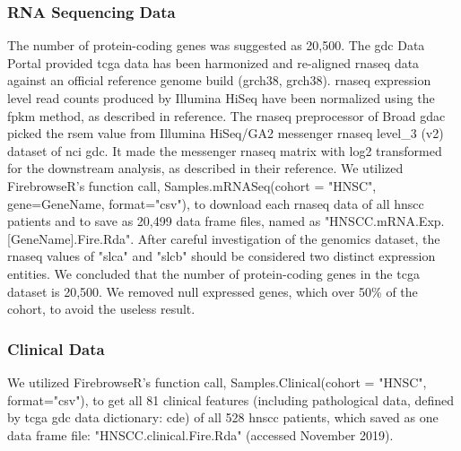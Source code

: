 \documentclass[jpm,article,submit,moreauthors,pdftex]{Definitions/mdpi}
\begin{document}
\begin{paracol}{2}
\subsubsection{RNA Sequencing Data} 

The number of protein-coding genes was suggested as 20,500\cite{Clamp2007}. The \acrshort{gdc} Data Portal provided \acrshort{tcga} data has been harmonized and re-aligned \acrlong{rnaseq} data against an official reference genome build (\acrlong{grch38}, \acrshort{grch38}). \acrshort{rnaseq} expression level read counts produced by Illumina HiSeq have been normalized using the \acrfull{fpkm} method, as described in reference\cite{FPKM2017}.
The \acrshort{rnaseq} preprocessor of Broad \acrshort{gdac} picked the \acrfull{rsem} value from Illumina HiSeq/GA2 messenger \acrshort{rnaseq} level\_3 (v2) dataset of \acrshort{nci} \acrshort{gdc}. It made the messenger \acrshort{rnaseq} matrix with log2 transformed for the downstream analysis, as described in their reference\cite{RSEM2016}.
We utilized FirebrowseR's function call, Samples.mRNASeq(cohort = "HNSC", gene=GeneName, format="csv"), to download each \acrshort{rnaseq} data of all \acrshort{hnscc} patients and to save as 20,499 data frame files, named as "HNSCC.mRNA.Exp.[GeneName].Fire.Rda".
After careful investigation of the genomics dataset, the \acrshort{rnaseq} values of "\acrfull{slca}" and "\acrfull{slcb}" should be considered two distinct expression entities. We concluded that the number of protein-coding genes in the \acrshort{tcga} dataset is 20,500. We removed null expressed genes, which over 50\% of the cohort, to avoid the useless result.

\subsubsection{Clinical Data} 

We utilized FirebrowseR's function call, Samples.Clinical(cohort = "HNSC", format="csv"), to get all 81 clinical features (including pathological data, defined by \acrshort{tcga} \acrshort{gdc} data dictionary: \acrfull{cde}\cite{CDE2019}) of all 528 \acrshort{hnscc} patients, which saved as one data frame file: "HNSCC.clinical.Fire.Rda" (accessed November 2019).


\end{paracol}
\end{document}
